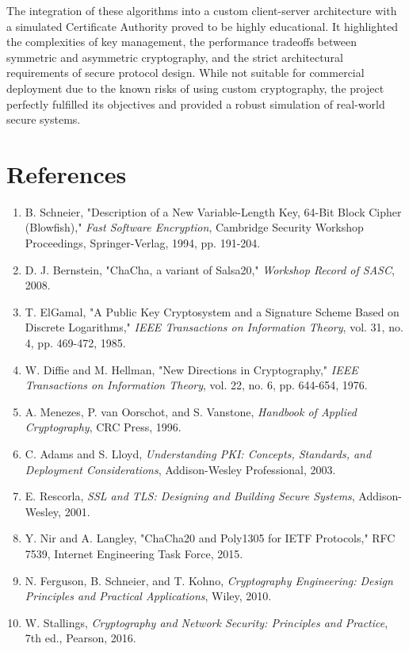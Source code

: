 \documentclass[12pt,a4paper]{article}
\begin{document}
The integration of these algorithms into a custom client-server architecture with a simulated Certificate Authority proved to be highly educational. It highlighted the complexities of key management, the performance tradeoffs between symmetric and asymmetric cryptography, and the strict architectural requirements of secure protocol design. While not suitable for commercial deployment due to the known risks of using custom cryptography, the project perfectly fulfilled its objectives and provided a robust simulation of real-world secure systems.



\newpage
\section{References}
\begin{enumerate}
    \item B. Schneier, "Description of a New Variable-Length Key, 64-Bit Block Cipher (Blowfish)," \textit{Fast Software Encryption}, Cambridge Security Workshop Proceedings, Springer-Verlag, 1994, pp. 191-204.
    \item D. J. Bernstein, "ChaCha, a variant of Salsa20," \textit{Workshop Record of SASC}, 2008.
    \item T. ElGamal, "A Public Key Cryptosystem and a Signature Scheme Based on Discrete Logarithms," \textit{IEEE Transactions on Information Theory}, vol. 31, no. 4, pp. 469-472, 1985.
    \item W. Diffie and M. Hellman, "New Directions in Cryptography," \textit{IEEE Transactions on Information Theory}, vol. 22, no. 6, pp. 644-654, 1976.
    \item A. Menezes, P. van Oorschot, and S. Vanstone, \textit{Handbook of Applied Cryptography}, CRC Press, 1996.
    \item C. Adams and S. Lloyd, \textit{Understanding PKI: Concepts, Standards, and Deployment Considerations}, Addison-Wesley Professional, 2003.
    \item E. Rescorla, \textit{SSL and TLS: Designing and Building Secure Systems}, Addison-Wesley, 2001.
    \item Y. Nir and A. Langley, "ChaCha20 and Poly1305 for IETF Protocols," RFC 7539, Internet Engineering Task Force, 2015.
    \item N. Ferguson, B. Schneier, and T. Kohno, \textit{Cryptography Engineering: Design Principles and Practical Applications}, Wiley, 2010.
    \item W. Stallings, \textit{Cryptography and Network Security: Principles and Practice}, 7th ed., Pearson, 2016.
\end{enumerate}
\end{document}
